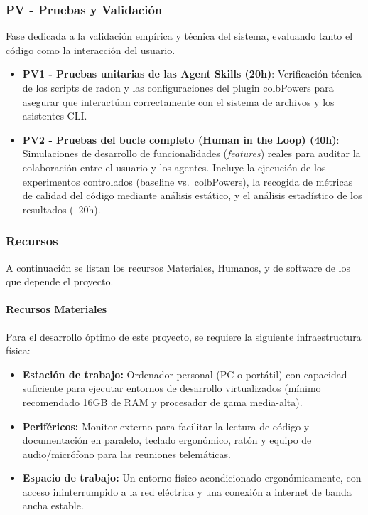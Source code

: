 \documentclass[11pt, letterpaper]{article}
\begin{document}
\subsubsection{PV - Pruebas y Validación}
\label{sec:pv}
Fase dedicada a la validación empírica y técnica del sistema, evaluando tanto el código como la interacción del usuario.
\begin{itemize}
    \item \textbf{PV1 - Pruebas unitarias de las Agent Skills (20h)}: Verificación técnica de los scripts de radon y las configuraciones del plugin colbPowers para asegurar que interactúan correctamente con el sistema de archivos y los asistentes CLI.
    \item \textbf{PV2 - Pruebas del bucle completo (Human in the Loop) (40h)}: Simulaciones de desarrollo de funcionalidades (\textit{features}) reales para auditar la colaboración entre el usuario y los agentes. Incluye la ejecución de los experimentos controlados (baseline vs.\ colbPowers), la recogida de métricas de calidad del código mediante análisis estático, y el análisis estadístico de los resultados (~20h).
\end{itemize}

\newpage

\subsubsection{Recursos}
\label{sec:recursos}
A continuación se listan los recursos Materiales, Humanos, y de software de los que depende el proyecto.
\paragraph{Recursos Materiales}
\label{sec:recursos_materiales}
Para el desarrollo óptimo de este proyecto, se requiere la siguiente infraestructura física:
\begin{itemize}
    \item \textbf{Estación de trabajo:} Ordenador personal (PC o portátil) con capacidad suficiente para ejecutar entornos de desarrollo virtualizados (mínimo recomendado 16GB de RAM y procesador de gama media-alta).
    \item \textbf{Periféricos:} Monitor externo para facilitar la lectura de código y documentación en paralelo, teclado ergonómico, ratón y equipo de audio/micrófono para las reuniones telemáticas.
    \item \textbf{Espacio de trabajo:} Un entorno físico acondicionado ergonómicamente, con acceso ininterrumpido a la red eléctrica y una conexión a internet de banda ancha estable.
\end{itemize}
\end{document}
